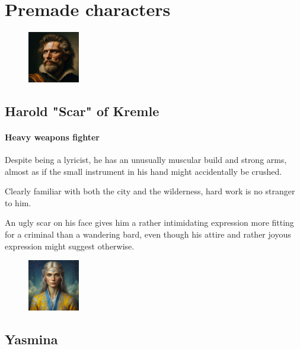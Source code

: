 \documentclass[10pt,onecolumn,twoside,openany,bg=full,layout=true]{dndbook}
\begin{document}
\section{Premade characters}\label{sec:premade-characters}
  \begin{figure}
    \begin{center}
      \includegraphics[width=0.2\textwidth]{img/harold}
    \end{center}
  \end{figure}
  \subsection {Harold "Scar" of Kremle}\label{subsec:harold-"scar"-of-kremle}
\paragraph{Heavy weapons fighter}
Despite being a lyricist, he has an unusually muscular build and strong arms, almost as if the small instrument in his
hand might accidentally be crushed.\par
Clearly familiar with both the city and the wilderness, hard work is no stranger to him.\par
An ugly scar on his face gives him a rather intimidating expression more fitting for a criminal than a wandering bard,
even though his attire and rather joyous expression might suggest otherwise.

  \begin{figure}
    \begin{center}
      \includegraphics[width=0.2\textwidth]{img/yasmina}
    \end{center}
  \end{figure}
  \subsection{Yasmina}\label{subsec:yasmina}
\end{document}
